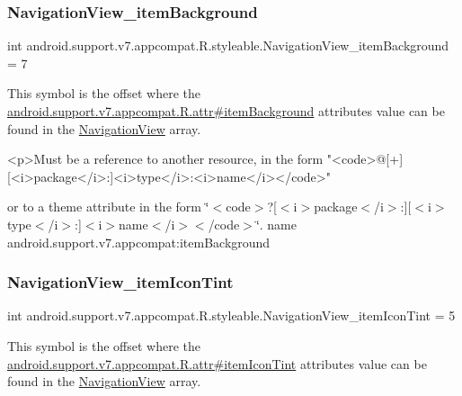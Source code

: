 \subsubsection{\texorpdfstring{Navigation\+View\+\_\+item\+Background}{NavigationView\_itemBackground}}
{\footnotesize\ttfamily int android.\+support.\+v7.\+appcompat.\+R.\+styleable.\+Navigation\+View\+\_\+item\+Background = 7\hspace{0.3cm}{\ttfamily [static]}}

This symbol is the offset where the \hyperlink{classandroid_1_1support_1_1v7_1_1appcompat_1_1R_1_1attr_af3d58ae96a7287454829f832ccdea6eb}{android.\+support.\+v7.\+appcompat.\+R.\+attr\#item\+Background} attribute\textquotesingle{}s value can be found in the \hyperlink{classandroid_1_1support_1_1v7_1_1appcompat_1_1R_1_1styleable_a52cfb3ba7bdfc8fb2cca459f35c24456}{Navigation\+View} array.

\begin{DoxyVerb}      <p>Must be a reference to another resource, in the form "<code>@[+][<i>package</i>:]<i>type</i>:<i>name</i></code>"
\end{DoxyVerb}
 or to a theme attribute in the form \char`\"{}$<$code$>$?\mbox{[}$<$i$>$package$<$/i$>$\+:\mbox{]}\mbox{[}$<$i$>$type$<$/i$>$\+:\mbox{]}$<$i$>$name$<$/i$>$$<$/code$>$\char`\"{}.  name android.\+support.\+v7.\+appcompat\+:item\+Background \mbox{\label{classandroid_1_1support_1_1v7_1_1appcompat_1_1R_1_1styleable_a045753abfbdae682420f420a25f71659}} 
\subsubsection{\texorpdfstring{Navigation\+View\+\_\+item\+Icon\+Tint}{NavigationView\_itemIconTint}}
{\footnotesize\ttfamily int android.\+support.\+v7.\+appcompat.\+R.\+styleable.\+Navigation\+View\+\_\+item\+Icon\+Tint = 5\hspace{0.3cm}{\ttfamily [static]}}

This symbol is the offset where the \hyperlink{classandroid_1_1support_1_1v7_1_1appcompat_1_1R_1_1attr_af738acc31f8dda0a49c48ffdd0cd864f}{android.\+support.\+v7.\+appcompat.\+R.\+attr\#item\+Icon\+Tint} attribute\textquotesingle{}s value can be found in the \hyperlink{classandroid_1_1support_1_1v7_1_1appcompat_1_1R_1_1styleable_a52cfb3ba7bdfc8fb2cca459f35c24456}{Navigation\+View} array.

